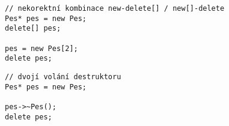 \begin{frame}[fragile]
\begin{noblock}{}
\begin{lstlisting}
// nekorektní kombinace new-delete[] / new[]-delete
Pes* pes = new Pes;
delete[] pes;

pes = new Pes[2];
delete pes;
\end{lstlisting}
\end{noblock}

\begin{noblock}{}
\begin{lstlisting}
// dvojí volání destruktoru
Pes* pes = new Pes;

pes->~Pes();
delete pes;
\end{lstlisting}
\end{noblock}
\end{frame}
